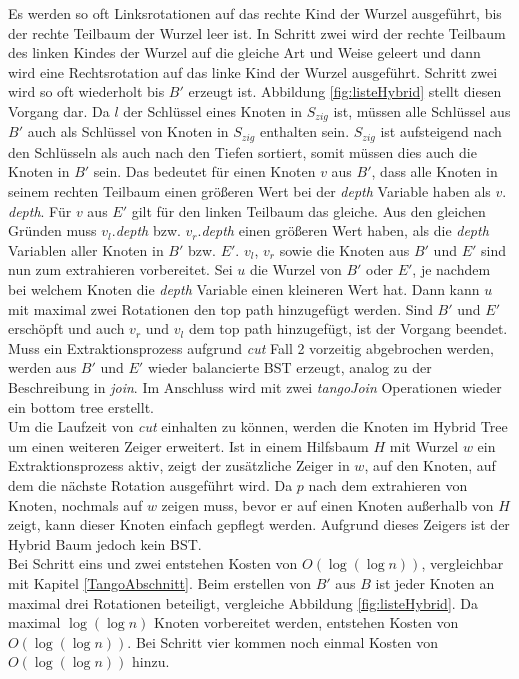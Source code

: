 \documentclass[a4paper,12pt]{article}
\begin{document}
Es werden so oft Linksrotationen auf das rechte Kind der Wurzel ausgeführt, bis der rechte Teilbaum der Wurzel leer ist. In Schritt zwei wird der rechte Teilbaum des linken Kindes der Wurzel auf die gleiche Art und Weise geleert und dann wird eine Rechtsrotation auf das linke Kind der Wurzel ausgeführt. Schritt zwei wird so oft wiederholt bis $B'$ erzeugt ist. Abbildung \ref{fig:listeHybrid} stellt diesen Vorgang dar. Da $l$ der Schlüssel eines Knoten in $S_{zig}$ ist, müssen alle Schlüssel aus $B'$ auch als Schlüssel von Knoten in $S_{zig}$ enthalten sein. $S_{zig}$ ist aufsteigend nach den Schlüsseln als auch nach den Tiefen sortiert, somit müssen dies auch die Knoten in $B'$ sein. Das bedeutet für einen Knoten $v$ aus $B'$, dass alle Knoten in seinem rechten Teilbaum einen größeren Wert bei der \textit{depth} Variable haben als $v.$\textit{depth}. Für  $v$ aus $E'$ gilt für den linken Teilbaum das gleiche. Aus den gleichen Gründen muss $v_l.$\textit{depth} bzw. $v_r.$\textit{depth} einen größeren Wert haben, als die \textit{depth} Variablen aller Knoten in $B'$ bzw. $E'$. $v_l$, $v_r$ sowie die Knoten aus $B'$ und $E'$ sind nun zum extrahieren vorbereitet. Sei $u$ die Wurzel von $B'$ oder $E'$, je nachdem bei welchem Knoten die \textit{depth} Variable einen kleineren Wert hat. Dann kann $u$ mit maximal zwei Rotationen den top path hinzugefügt werden. Sind $B'$ und  $E'$ erschöpft und auch $v_r$ und $v_l$ dem top path hinzugefügt, ist der Vorgang beendet.\\
Muss ein Extraktionsprozess aufgrund \textit{cut} Fall 2 vorzeitig abgebrochen werden, werden aus $B'$ und $E'$ wieder balancierte BST erzeugt, analog zu der Beschreibung in \textit{join}. Im Anschluss wird mit zwei \textit{tangoJoin} Operationen wieder ein bottom tree erstellt.\\
Um die Laufzeit von \textit{cut} einhalten zu können, werden die Knoten im Hybrid Tree um einen weiteren Zeiger erweitert. Ist in einem Hilfsbaum $H$ mit Wurzel $w$ ein Extraktionsprozess aktiv, zeigt der zusätzliche Zeiger in $w$, auf den Knoten, auf dem die nächste Rotation ausgeführt wird. Da $p$ nach dem extrahieren von Knoten, nochmals auf $w$ zeigen muss, bevor er auf einen Knoten außerhalb von $H$ zeigt, kann dieser Knoten einfach gepflegt werden. Aufgrund dieses Zeigers ist der Hybrid Baum jedoch kein BST.\\
Bei Schritt eins und zwei entstehen Kosten von $O\left(\log \left(\log n\right)\right)$, vergleichbar mit Kapitel \ref{TangoAbschnitt}. Beim erstellen von $B'$ aus $B$ ist jeder Knoten an maximal drei Rotationen beteiligt, vergleiche Abbildung \ref{fig:listeHybrid}. Da maximal  $\log\left(\log n\right)$ Knoten vorbereitet werden, entstehen Kosten von  $O\left(\log\left(\log n\right)\right)$. Bei Schritt vier kommen noch einmal Kosten von $O\left(\log\left(\log n\right)\right)$ hinzu.
\end{document}
